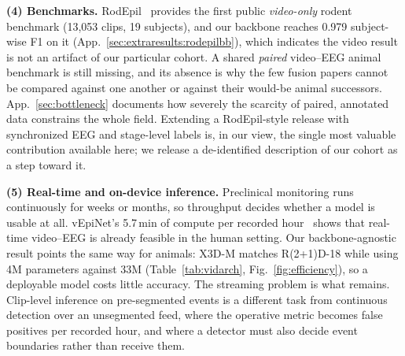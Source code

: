 \noindent\textbf{(4) Benchmarks.}
RodEpil~\cite{rodepil2025} provides the first public \emph{video-only} rodent
benchmark (13{,}053 clips, 19 subjects), and our backbone reaches 0.979 subject-wise
F1 on it (App.~\ref{sec:extraresults:rodepilbb}), which indicates the video result is
not an artifact of our particular cohort. A shared \emph{paired} video--EEG animal
benchmark is still missing, and its absence is why the few fusion papers cannot be compared against one another or against their would-be animal successors.
App.~\ref{sec:bottleneck} documents how severely the scarcity of paired, annotated
data constrains the whole field. Extending a RodEpil-style release with synchronized
EEG and stage-level labels is, in our view, the single most valuable contribution
available here; we release a de-identified description of our cohort as a step toward
it.

\noindent\textbf{(5) Real-time and on-device inference.}
Preclinical monitoring runs continuously for weeks or months, so throughput decides
whether a model is usable at all. vEpiNet's 5.7\,min of compute per recorded
hour~\cite{vepinet2024} shows that real-time video--EEG is already feasible in the
human setting. Our backbone-agnostic result points the same way for animals: X3D-M
matches R(2+1)D-18 while using 4M parameters against 33M
(Table~\ref{tab:vidarch}, Fig.~\ref{fig:efficiency}), so a deployable model costs
little accuracy. The streaming problem is what remains. Clip-level inference on
pre-segmented events is a different task from continuous detection over an
unsegmented feed, where the operative metric becomes false positives per recorded
hour, and where a detector must also decide event boundaries rather than receive
them.

